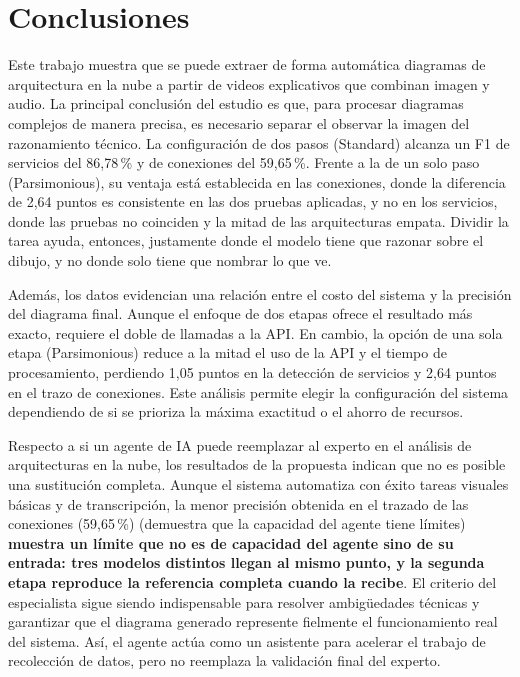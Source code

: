 \documentclass[a4paper, twocolumn, 10pt]{IEEEtran}
\newcommand{\nuevo}[1]{{\bfseries #1}}
\newcommand{\quitado}[1]{(#1)}
\begin{document}
\section{Conclusiones}
Este trabajo muestra que se puede extraer de forma automática diagramas de arquitectura en la nube a partir de videos explicativos que combinan imagen y audio. La principal conclusión del estudio es que, para procesar diagramas complejos de manera precisa, es necesario separar el observar la imagen del razonamiento técnico. La configuración de dos pasos (Standard) alcanza un F1 de servicios del 86,78\,\% y de conexiones del 59,65\,\%. Frente a la de un solo paso (Parsimonious), su ventaja está establecida en las conexiones, donde la diferencia de 2,64 puntos es consistente en las dos pruebas aplicadas, y no en los servicios, donde las pruebas no coinciden y la mitad de las arquitecturas empata. Dividir la tarea ayuda, entonces, justamente donde el modelo tiene que razonar sobre el dibujo, y no donde solo tiene que nombrar lo que ve.
 
Además, los datos evidencian una relación entre el costo del sistema y la precisión del diagrama final. Aunque el enfoque de dos etapas ofrece el resultado más exacto, requiere el doble de llamadas a la API. En cambio, la opción de una sola etapa (Parsimonious) reduce a la mitad el uso de la API y el tiempo de procesamiento, perdiendo 1,05 puntos en la detección de servicios y 2,64 puntos en el trazo de conexiones. Este análisis permite elegir la configuración del sistema dependiendo de si se prioriza la máxima exactitud o el ahorro de recursos.
 
Respecto a si un agente de IA puede reemplazar al experto en el análisis de arquitecturas en la nube, los resultados de la propuesta indican que no es posible una sustitución completa. Aunque el sistema automatiza con éxito tareas visuales básicas y de transcripción, la menor precisión obtenida en el trazado de las conexiones (59,65\,\%) \quitado{demuestra que la capacidad del agente tiene límites} \nuevo{muestra un límite que no es de capacidad del agente sino de su entrada: tres modelos distintos llegan al mismo punto, y la segunda etapa reproduce la referencia completa cuando la recibe}. El criterio del especialista sigue siendo indispensable para resolver ambigüedades técnicas y garantizar que el diagrama generado represente fielmente el funcionamiento real del sistema. Así, el agente actúa como un asistente para acelerar el trabajo de recolección de datos, pero no reemplaza la validación final del experto.
 
\end{document}
